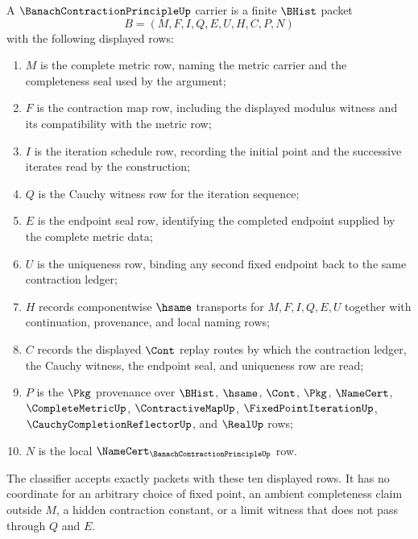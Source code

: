 \begin{definition}
\label{def:banach-contraction-principle-carrier}
A $\BanachContractionPrincipleUp$ carrier is a finite $\BHist$ packet
$$
B=(M,F,I,Q,E,U,H,C,P,N)
$$
with the following displayed rows:
\begin{enumerate}
\item $M$ is the complete metric row, naming the metric carrier and the completeness seal used by the argument;
\item $F$ is the contraction map row, including the displayed modulus witness and its compatibility with the metric row;
\item $I$ is the iteration schedule row, recording the initial point and the successive iterates read by the construction;
\item $Q$ is the Cauchy witness row for the iteration sequence;
\item $E$ is the endpoint seal row, identifying the completed endpoint supplied by the complete metric data;
\item $U$ is the uniqueness row, binding any second fixed endpoint back to the same contraction ledger;
\item $H$ records componentwise $\hsame$ transports for $M,F,I,Q,E,U$ together with continuation, provenance, and local naming rows;
\item $C$ records the displayed $\Cont$ replay routes by which the contraction ledger, the Cauchy witness, the endpoint seal, and uniqueness row are read;
\item $P$ is the $\Pkg$ provenance over $\BHist$, $\hsame$, $\Cont$, $\Pkg$, $\NameCert$, $\CompleteMetricUp$, $\ContractiveMapUp$, $\FixedPointIterationUp$, $\CauchyCompletionReflectorUp$, and $\RealUp$ rows;
\item $N$ is the local $\NameCert_{\BanachContractionPrincipleUp}$ row.
\end{enumerate}
The classifier accepts exactly packets with these ten displayed rows. It has
no coordinate for an arbitrary choice of fixed point, an ambient completeness
claim outside $M$, a hidden contraction constant, or a limit witness that does
not pass through $Q$ and $E$.
\end{definition}

